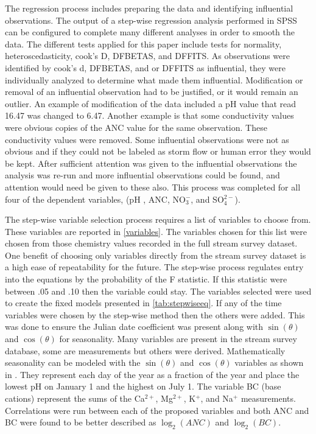 The regression process includes preparing the data and identifying influential observations. 
The output of a step-wise regression analysis performed in SPSS can be configured to complete many different analyses in order to smooth the data. 
The different tests applied for this paper include tests for normality, heteroscedasticity, cook's D, DFBETAS, and DFFITS. As observations were identified by cook's d, DFBETAS, and or DFFITS as influential, they were individually analyzed to determine what made them influential. 
Modification or removal of an influential observation had to be justified, or it would remain an outlier. 
An example of modification of the data included a pH value that read 16.47 was changed to 6.47. 
Another example is that some conductivity values were obvious copies of the ANC value for the same observation. 
These conductivity values were removed. Some influential observations were not as obvious and if they could not be labeled as storm flow or human error they would be kept. 
After sufficient attention was given to the influential observations the analysis was re-run and more influential observations could be found, and attention would need be given to these also. 
This process was completed for all four of the dependent variables, (pH , ANC, NO$_3^-$, and SO$_4^{2-}$).
 
 The step-wise variable selection process requires a list of variables to choose from.  
These variables are reported in \autoref{variables}.  
The variables chosen for this list were chosen from those chemistry values recorded in the full stream survey dataset.   
One benefit of choosing only variables directly from the stream survey dataset is a high ease of repeatability for the future.   
The step-wise process regulates entry into the equations by the probability of the F statistic.  If this statistic were between .05 and .10 then the variable could stay.   
The variables selected were used to create the fixed models presented in \autoref{tab:stepwiseeq}.  
If any of the time variables were chosen by the step-wise method then the others were added.  
This was done to ensure the Julian date coefficient was present along with $\sin(\theta)$ and $\cos(\theta)$ for seasonality.  
Many variables are present in the stream survey database, some are measurements but others were derived.  
Mathematically seasonality can be modeled with the $\sin(\theta)$ and $\cos(\theta)$ variables as shown in \citet{helsel1992statistical}. 
They represent each day of the year as a fraction of the year and place the lowest pH on January 1 and the highest on July 1.  
The variable BC (base cations) represent the sums of the Ca$^{2+}$, Mg$^{2+}$, K$^+$, and Na$^+$ measurements.  
Correlations were run between each of the proposed variables  and both ANC and BC were found to be better described as $\log_2(ANC)$ and $\log_2(BC)$.
 
